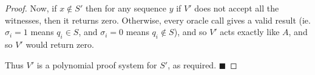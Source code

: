 \documentclass[10pt]{article}
\def\qed{%
    \ifmmode%
        \eqno\blacksquare%
    \else%
        \hskip1cm\allowbreak\hbox{}\nobreak\hfill$\blacksquare$%
    \fi%
}
\begin{document}
\begin{proof}
    Now, if $x\notin S'$ then for any sequence $y$ if $V'$ does not accept all the witnesses, then it returns zero.
    Otherwise, every oracle call gives a valid result (ie. $\sigma_i=1$ means $q_i\in S$, and $\sigma_i=0$ means $q_i\notin S$), and so $V'$ acts exactly like $A$, and so $V'$ would return zero.

    Thus $V'$ is a polynomial proof system for $S'$, as required.
    \qed

\end{proof}
\end{document}
